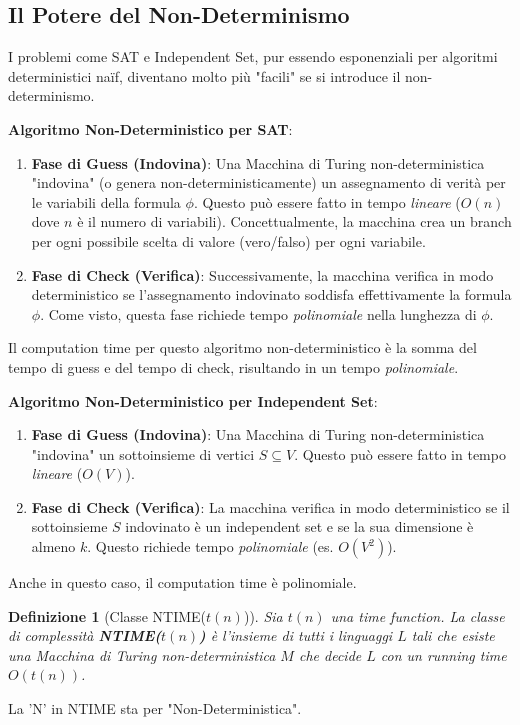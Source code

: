 \documentclass[a4paper, 11pt]{book} %
\newtheorem{definition}[theorem]{Definizione}
\theoremstyle{definition}
\begin{document}
\subsection{Il Potere del Non-Determinismo}
I problemi come SAT e Independent Set, pur essendo esponenziali per algoritmi deterministici naïf, diventano molto più "facili" se si introduce il non-determinismo.

\textbf{Algoritmo Non-Deterministico per SAT}:
\begin{enumerate}
    \item \textbf{Fase di Guess (Indovina)}: Una Macchina di Turing non-deterministica "indovina" (o genera non-deterministicamente) un assegnamento di verità per le variabili della formula $\phi$. Questo può essere fatto in tempo \emph{lineare} ($O(n)$ dove $n$ è il numero di variabili). Concettualmente, la macchina crea un branch per ogni possibile scelta di valore (vero/falso) per ogni variabile.
    \item \textbf{Fase di Check (Verifica)}: Successivamente, la macchina verifica in modo deterministico se l'assegnamento indovinato soddisfa effettivamente la formula $\phi$. Come visto, questa fase richiede tempo \emph{polinomiale} nella lunghezza di $\phi$.
\end{enumerate}
Il computation time per questo algoritmo non-deterministico è la somma del tempo di guess e del tempo di check, risultando in un tempo \emph{polinomiale}.

\textbf{Algoritmo Non-Deterministico per Independent Set}:
\begin{enumerate}
    \item \textbf{Fase di Guess (Indovina)}: Una Macchina di Turing non-deterministica "indovina" un sottoinsieme di vertici $S \subseteq V$. Questo può essere fatto in tempo \emph{lineare} ($O(V)$).
    \item \textbf{Fase di Check (Verifica)}: La macchina verifica in modo deterministico se il sottoinsieme $S$ indovinato è un independent set e se la sua dimensione è almeno $k$. Questo richiede tempo \emph{polinomiale} (es. $O(V^2)$).
\end{enumerate}
Anche in questo caso, il computation time è polinomiale.

\begin{definition}[Classe NTIME($t(n)$)]
Sia $t(n)$ una time function. La classe di complessità \textbf{NTIME($t(n)$)} è l'insieme di tutti i linguaggi $L$ tali che esiste una Macchina di Turing \emph{non-deterministica} $M$ che decide $L$ con un running time $O(t(n))$.
\end{definition}
La 'N' in NTIME sta per "Non-Deterministica".
\end{document}
